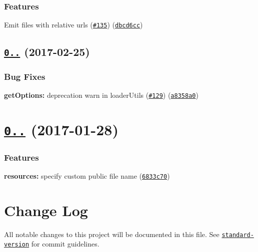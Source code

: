 \subsubsection*{Features}


\begin{DoxyItemize}
\item Emit files with relative urls (\href{https://github.com/webpack/file-loader/issues/135}{\tt \#135}) (\href{https://github.com/webpack/file-loader/commit/dbcd6cc}{\tt dbcd6cc})
\end{DoxyItemize}

\label{_0.10.1}%
 \subsection*{\href{https://github.com/webpack/file-loader/compare/v0.10.0...v0.10.1}{\tt 0..} (2017-\/02-\/25)}

\subsubsection*{Bug Fixes}


\begin{DoxyItemize}
\item {\bfseries get\+Options\+:} deprecation warn in loader\+Utils (\href{https://github.com/webpack/file-loader/issues/129}{\tt \#129}) (\href{https://github.com/webpack/file-loader/commit/a8358a0}{\tt a8358a0})
\end{DoxyItemize}

\label{_0.10.0}%
 \section*{\href{https://github.com/webpack/file-loader/compare/v0.9.0...v0.10.0}{\tt 0..} (2017-\/01-\/28)}

\subsubsection*{Features}


\begin{DoxyItemize}
\item {\bfseries resources\+:} specify custom public file name (\href{https://github.com/webpack/file-loader/commit/6833c70}{\tt 6833c70})
\end{DoxyItemize}

\section*{Change Log}

All notable changes to this project will be documented in this file. See \href{https://github.com/conventional-changelog/standard-version}{\tt standard-\/version} for commit guidelines. 